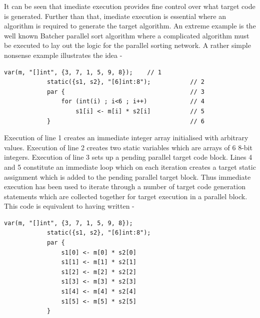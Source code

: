         It can be seen that imediate execution provides fine control over what
        target code is generated. Further than that, imediate execution is
        essential where an algorithm is required to generate the target algorithm.
        An extreme example is the well known Batcher parallel sort algorithm where
        a complicated algorithm must be executed to lay out the logic for the
        parallel sorting network. A rather simple nonsense example illustrates the
        idea -
        \begin{lstlisting}[language=threepl]
            var(m, "[]int", {3, 7, 1, 5, 9, 8});    // 1
            static({s1, s2}, "[6]int:8");           // 2
            par {                                   // 3
                for (int(i) ; i<6 ; i++)            // 4
                    s1[i] <- m[i] * s2[i]           // 5
            }                                       // 6
        \end{lstlisting}
        Execution of line 1 creates an immediate integer array initialised with
        arbitrary values. Execution of line 2 creates two static variables which are
        arrays of 6 8-bit integers. Execution of line 3 sets up a pending parallel
        target code block. Lines 4 and 5 constitute an immediate loop which on
        each iteration creates a target static assignment which is added to the
        pending parallel target block. Thus immediate execution has been used to
        iterate through a number of target code generation statements which are
        collected together for target execution in a parallel block. This code is
        equivalent to having written -
        \begin{lstlisting}[language=threepl]
            var(m, "[]int", {3, 7, 1, 5, 9, 8});    
            static({s1, s2}, "[6]int:8");   
            par {   
                s1[0] <- m[0] * s2[0]
                s1[1] <- m[1] * s2[1]
                s1[2] <- m[2] * s2[2]
                s1[3] <- m[3] * s2[3]
                s1[4] <- m[4] * s2[4]
                s1[5] <- m[5] * s2[5]
            }
        \end{lstlisting}

